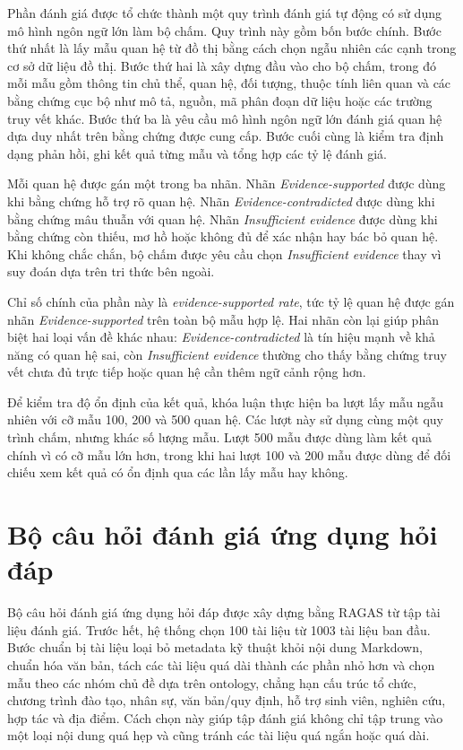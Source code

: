 Phần đánh giá được tổ chức thành một quy trình đánh giá tự động có sử dụng mô hình ngôn ngữ lớn làm bộ chấm. Quy trình này gồm bốn bước chính. Bước thứ nhất là lấy mẫu quan hệ từ đồ thị bằng cách chọn ngẫu nhiên các cạnh trong cơ sở dữ liệu đồ thị. Bước thứ hai là xây dựng đầu vào cho bộ chấm, trong đó mỗi mẫu gồm thông tin chủ thể, quan hệ, đối tượng, thuộc tính liên quan và các bằng chứng cục bộ như mô tả, nguồn, mã phân đoạn dữ liệu hoặc các trường truy vết khác. Bước thứ ba là yêu cầu mô hình ngôn ngữ lớn đánh giá quan hệ dựa duy nhất trên bằng chứng được cung cấp. Bước cuối cùng là kiểm tra định dạng phản hồi, ghi kết quả từng mẫu và tổng hợp các tỷ lệ đánh giá.

Mỗi quan hệ được gán một trong ba nhãn. Nhãn \textit{Evidence-supported} được dùng khi bằng chứng hỗ trợ rõ quan hệ. Nhãn \textit{Evidence-contradicted} được dùng khi bằng chứng mâu thuẫn với quan hệ. Nhãn \textit{Insufficient evidence} được dùng khi bằng chứng còn thiếu, mơ hồ hoặc không đủ để xác nhận hay bác bỏ quan hệ. Khi không chắc chắn, bộ chấm được yêu cầu chọn \textit{Insufficient evidence} thay vì suy đoán dựa trên tri thức bên ngoài.

Chỉ số chính của phần này là \textit{evidence-supported rate}, tức tỷ lệ quan hệ được gán nhãn \textit{Evidence-supported} trên toàn bộ mẫu hợp lệ. Hai nhãn còn lại giúp phân biệt hai loại vấn đề khác nhau: \textit{Evidence-contradicted} là tín hiệu mạnh về khả năng có quan hệ sai, còn \textit{Insufficient evidence} thường cho thấy bằng chứng truy vết chưa đủ trực tiếp hoặc quan hệ cần thêm ngữ cảnh rộng hơn.

Để kiểm tra độ ổn định của kết quả, khóa luận thực hiện ba lượt lấy mẫu ngẫu nhiên với cỡ mẫu 100, 200 và 500 quan hệ. Các lượt này sử dụng cùng một quy trình chấm, nhưng khác số lượng mẫu. Lượt 500 mẫu được dùng làm kết quả chính vì có cỡ mẫu lớn hơn, trong khi hai lượt 100 và 200 mẫu được dùng để đối chiếu xem kết quả có ổn định qua các lần lấy mẫu hay không.

\section{Bộ câu hỏi đánh giá ứng dụng hỏi đáp}

Bộ câu hỏi đánh giá ứng dụng hỏi đáp được xây dựng bằng RAGAS từ tập tài liệu đánh giá. Trước hết, hệ thống chọn 100 tài liệu từ 1003 tài liệu ban đầu. Bước chuẩn bị tài liệu loại bỏ metadata kỹ thuật khỏi nội dung Markdown, chuẩn hóa văn bản, tách các tài liệu quá dài thành các phần nhỏ hơn và chọn mẫu theo các nhóm chủ đề dựa trên ontology, chẳng hạn cấu trúc tổ chức, chương trình đào tạo, nhân sự, văn bản/quy định, hỗ trợ sinh viên, nghiên cứu, hợp tác và địa điểm. Cách chọn này giúp tập đánh giá không chỉ tập trung vào một loại nội dung quá hẹp và cũng tránh các tài liệu quá ngắn hoặc quá dài.

